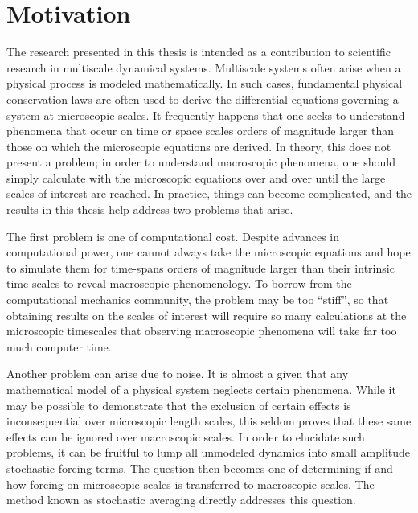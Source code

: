 \section{Motivation}

The research presented in this thesis is intended as a contribution to scientific research in multiscale dynamical systems. Multiscale systems often arise when a physical process is modeled mathematically. In such cases, fundamental physical conservation laws are often used to derive the differential equations governing a system at microscopic scales. It frequently happens that one seeks to understand phenomena that occur on time or space scales orders of magnitude larger than those on which the microscopic equations are derived. In theory, this does not present a problem; in order to understand macroscopic phenomena, one should simply calculate with the microscopic equations over and over until the large scales of interest are reached. In practice, things can become complicated, and the results in this thesis help address two problems that arise.

The first problem is one of computational cost. Despite advances in computational power, one cannot always take the microscopic equations and hope to simulate them for time-spans orders of magnitude larger than their intrinsic time-scales to reveal macroscopic phenomenology. To borrow from the computational mechanics community, the problem may be too ``stiff'', so that obtaining results on the scales of interest will require so many calculations at the microscopic timescales that observing macroscopic phenomena will take far too much computer time.

Another problem can arise due to noise. It is almost a given that any mathematical model of a physical system neglects certain phenomena. While it may be possible to demonstrate that the exclusion of certain effects is inconsequential over microscopic length scales, this seldom proves that these same effects can be ignored over macroscopic scales. In order to elucidate such problems, it can be fruitful to lump all unmodeled dynamics into small amplitude stochastic forcing terms. The question then becomes one of determining if and how forcing on microscopic scales is transferred to macroscopic scales. The method known as stochastic averaging directly addresses this question.


